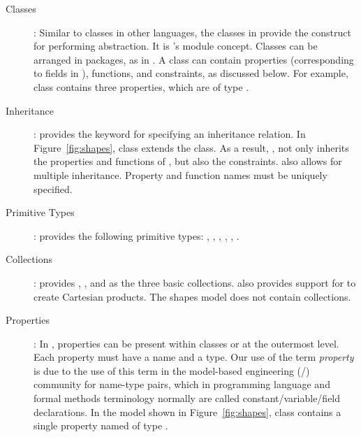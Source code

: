 \begin{description}

\item [Classes]: Similar to classes in other languages, the classes in
  \Klang{} provide the construct for performing abstraction. It is \Klang{}'s
   module concept. Classes can be arranged in packages, as in \java.
   A class can contain properties (corresponding to fields in \java), functions, 
   and constraints, as discussed below. For example, class  
   contains three properties, which are of type .

\item [Inheritance]: \Klang{} provides the  keyword for
  specifying an inheritance relation. In Figure~\ref{fig:shapes},
   class extends the  class. As a result,
  , not only inherits the properties and functions of
  , but also the constraints. \Klang{} also allows for
  multiple inheritance. Property and function names must be uniquely
  specified.

\item [Primitive Types]: \Klang{} provides the following primitive
  types: , , , ,
  , .

\item [Collections]: \Klang{} provides , , and
   as the three basic collections. \Klang{} also provides
  support for  to create Cartesian products. The shapes model
  does not contain collections.

\item [Properties]: In \Klang{}, properties can be present within
  classes or at the outermost level. Each property must have a name
  and a type. Our use of the term {\em property} is due to the use of this term
  in the model-based engineering (\uml/\sysml) community for name-type pairs,
  which in programming language and formal methods terminology normally are called
  constant/variable/field declarations.
  In the model shown in Figure~\ref{fig:shapes}, class
   contains a single property named  of type
  .


\end{description}

